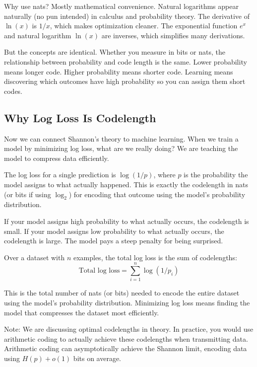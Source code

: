 Why use nats? Mostly mathematical convenience. Natural logarithms appear naturally (no pun intended) in calculus and probability theory. The derivative of $\ln(x)$ is $1/x$, which makes optimization cleaner. The exponential function $e^x$ and natural logarithm $\ln(x)$ are inverses, which simplifies many derivations.

But the concepts are identical. Whether you measure in bits or nats, the relationship between probability and code length is the same. Lower probability means longer code. Higher probability means shorter code. Learning means discovering which outcomes have high probability so you can assign them short codes.

\subsection{Why Log Loss Is Codelength}

Now we can connect Shannon's theory to machine learning. When we train a model by minimizing log loss, what are we really doing? We are teaching the model to compress data efficiently.

The log loss for a single prediction is $\log(1/p)$, where $p$ is the probability the model assigns to what actually happened. This is exactly the codelength in nats (or bits if using $\log_2$) for encoding that outcome using the model's probability distribution.

If your model assigns high probability to what actually occurs, the codelength is small. If your model assigns low probability to what actually occurs, the codelength is large. The model pays a steep penalty for being surprised.

Over a dataset with $n$ examples, the total log loss is the sum of codelengths:
\begin{equation}
\text{Total log loss} = \sum_{i=1}^{n} \log(1/p_i)
\end{equation}

This is the total number of nats (or bits) needed to encode the entire dataset using the model's probability distribution. Minimizing log loss means finding the model that compresses the dataset most efficiently.

Note: We are discussing optimal codelengths in theory. In practice, you would use arithmetic coding to actually achieve these codelengths when transmitting data. Arithmetic coding can asymptotically achieve the Shannon limit, encoding data using $H(p) + o(1)$ bits on average. 


